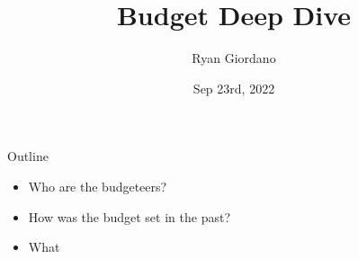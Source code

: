 \documentclass[8pt]{beamer}
\title{Budget Deep Dive}
\author{Ryan Giordano}
\date{Sep 23rd, 2022}
\institute{Children's Community Center}
\begin{document}

\begin{frame}{Outline}
%
\begin{itemize}
%
\item Who are the budgeteers?
\item How was the budget set in the past?
\item What 
%
\end{itemize}
%
\end{frame}
\end{document}

